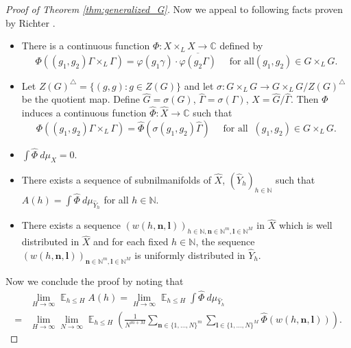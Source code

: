 \documentclass[12pt]{article}
\theoremstyle{plain} %
\theoremstyle{definition} %
\theoremstyle{plain}
\theoremstyle{plain}
\numberwithin{equation}{section}
\newcommand{\N}{\mathbb{N}}
\newcommand{\C}{\mathbb{C}}
\renewcommand{\leq}{\leqslant}
\newcommand{\1}{\mathbbm{1}}
\newcommand{\E}{\operatorname{\mathbb{E}}}
\newcommand{\oo}{\infty}
\begin{document}
\begin{proof}[Proof of Theorem \ref{thm:generalized_G}]
Now we appeal to following facts proven by Richter \cite[pp. 453-466]{Richter23}.
 \begin{itemize}
    \item There is a continuous function $\Phi:X\times_L X\rightarrow \C$ defined by 
    \begin{equation}
        \Phi((g_1,g_2)\Gamma\times_L \Gamma) = \varphi(g_1\gamma)\cdot \overline{\varphi(g_2\Gamma)} \quad \text{ for all} (g_1,g_2)\in G\times_L G.
    \end{equation}
     \item Let $Z(G)^{\triangle} = \{(g,g):g\in Z(G)\}$ and let $\sigma: G\times_L G\rightarrow G\times_L G/Z(G)^{\triangle}$ be the quotient map. Define $\widehat{G} = \sigma(G)$, $\widehat{\Gamma}= \sigma(\Gamma)$, $\widehat{X}=\widehat{G}/\widehat{\Gamma}$. Then $\Phi$ induces a continuous function $\widehat{\Phi}:\widehat{X}\rightarrow \C$ such that 
         \begin{equation}
        \Phi((g_1,g_2)\Gamma\times_L \Gamma) = \widehat{\Phi}(\sigma(g_1,g_2)\widehat{\Gamma}) \quad \text{ for all }~ (g_1,g_2)\in G\times_L G.
        \end{equation}
    \item $\int \widehat{\Phi}~d\mu_{\widehat{X}}=0$.
    \item There exists a sequence of subnilmanifolds of $\widehat{X}$, $(\widehat{Y}_h)_{h\in \N}$ such that $A(h) = \int \widehat{\Phi}~d\mu_{\widehat{Y}_h}$ for all $h\in \N$.
    \item There exists a sequence $(w(h,\mathbf{n}, \mathbf{l}))_{h\in \N, \mathbf{n}\in \N^{m},\mathbf{l}\in \N^{M}}$ in $\widehat{X}$ which is well distributed in $\widehat{X}$ and for each fixed $h\in \N$, the sequence $(w(h,\mathbf{n}, \mathbf{l}))_{\mathbf{n}\in \N^{m},\mathbf{l}\in \N^{M}}$ is uniformly distributed in $\widehat{Y}_h$.
 \end{itemize}
 
Now we conclude the proof by noting that 
\begin{align*}
    &\lim_{H\to\oo}\E_{h\leq H}A(h)= \lim_{H\to\oo}\E_{h\leq H}\int \widehat{\Phi}~d\mu_{\widehat{Y}_h}\\ =& \lim_{H\to\oo}\lim_{N\to\oo}\E_{h\leq H}\left(\frac{1}{N^{m+M}}\sum_{\mathbf{n}\in\{1,\dots, N\}^{m}}\sum_{\mathbf{l}\in\{1,\dots, N\}^M}\widehat{\Phi}(w(h,\mathbf{n}, \mathbf{l}))\right).
\end{align*}
 

\end{proof}
\end{document}
